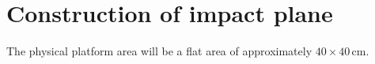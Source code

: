 \section{Construction of impact plane}
\label{impactPlane}

The physical platform area will be a flat area of approximately $40\times40\,\si{\centi\meter}$.